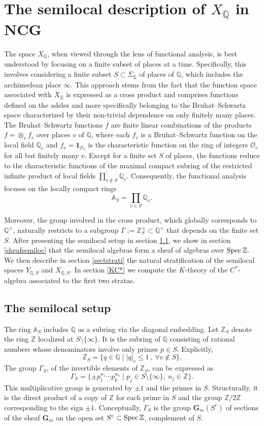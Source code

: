 \documentclass[letterpaper,11pt]{article}
\def\Spec{{\rm Spec\,}}
\def\A{{\mathbb A}}
\def\Q{{\mathbb Q}}
\def\Z{\mathbb{Z}}
\theoremstyle{plain}
\begin{document}
\section{The  semilocal description of $X_\Q$ in NCG}\label{sect4}

The space $ X_\Q $, when viewed through the lens of functional analysis, is best understood by focusing on a finite subset of places at a time. Specifically, this involves considering a finite subset $ S \subset \Sigma_\Q $ of places of $ \Q $, which includes the archimedean place $ \infty $. This approach stems from the fact that the function space associated with $ X_\Q $ is expressed as a cross product and comprises functions defined on the adeles and more specifically belonging to the Bruhat–Schwartz space characterized by their non-trivial dependence on only finitely many places. The Bruhat–Schwartz functions $f$ are finite linear combinations of the products $f=\otimes_v f_v$ over  places $v$ of $\Q$, where each $f_v$ is a Bruhat–Schwartz function on the local field $\Q_v$ and $f_v=\mathbf{1}_{\mathcal{O}_v}$ is the characteristic function on the ring of integers $\mathcal{O}_v$ for all but finitely many $v$. Except for a finite set $S$ of places, the functions reduce to the characteristic functions of the maximal compact subring of the restricted infinite product of local fields $ \prod^{\prime}_{v \notin S} \Q_v $. Consequently, the functional analysis focuses on the locally compact rings  
\[
\A_S = \prod_{v \in S} \Q_v.
\]


Moreover, the group involved in the cross product, which globally corresponds to $ \Q^\times $, naturally restricts to a subgroup $ \Gamma := \Z_S^\times \subset \Q^\times $ that depends on the finite set $ S $. After presenting the semilocal setup in section \ref{semilocprep}, we show in section \ref{sheafsemiloc} that the semilocal algebras form a sheaf of algebras over $\Spec\Z$. We then describe in section \ref{sectstrati} the natural stratification of the semilocal spaces  $ Y_{\Q,S} $ and $ X_{\Q,S} $. In section \ref{KC*} we compute the $K$-theory of the $C^*$-algebra associated to the first two stratas.
\subsection{The semilocal setup}\label{semilocprep}
The ring $ \A_S $ includes $ \Q $ as a subring via the diagonal embedding. Let $ \Z_S $ denote the 
ring $\Z$ localized at $S \setminus \{\infty\}$. It is the subring of $ \Q $ consisting of rational numbers 
whose denominators involve only primes $ p \in S $. Explicitly,  
\[
\Z_S = \{ q \in \Q \mid |q|_v \leq 1 \,, \ \forall v \notin S \}.
\]  
The group $ \Gamma_S$, of the invertible elements of $ \Z_S $, can be expressed as  
\[
\Gamma_S =  \{ \pm p_1^{n_1} \cdots p_k^{n_k} \mid p_j \in S \setminus \{\infty\}, \ n_j \in \Z \}.
\]  
This multiplicative group is generated by $ \pm 1 $ and the primes in $ S $. Structurally, it is the direct product of a copy of $ \Z $ for each prime in $ S $ and the group $ \Z/2\Z $ corresponding to the sign $ \pm 1 $. Conceptually, $ \Gamma_S $ is the group $\mathbf{G}_m(S^c)$ of sections of the sheaf $\mathbf{G}_m$  on the open set $S^c\subset \Spec \Z$, complement of $S$.
\end{document}
